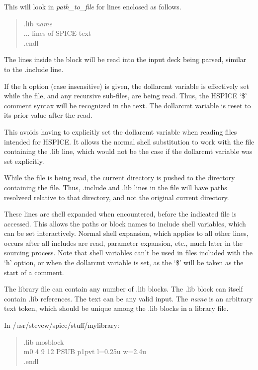 This will look in {\it path\_to\_file} for lines enclosed as follows.
\begin{quote}
    {\vt .lib} {\it name}\\
    ... lines of SPICE text\\
    {\vt .endl}
\end{quote}
The lines inside the block will be read into the input deck being
parsed, similar to the {\vt .include} line.

If the {\vt h} option (case insensitive) is given, the {\et dollarcmt}
variable is effectively set while the file, and any recursive
sub-files, are being read.  Thus, the HSPICE `{\vt \$}' comment syntax
will be recognized in the text.  The {\et dollarcmt} variable is reset
to its prior value after the read.

This avoids having to explicitly set the {\et dollarcmt} variable when
reading files intended for HSPICE.  It allows the normal {\WRspice}
shell substitution to work with the file containing the {\vt .lib}
line, which would not be the case if the {\et dollarcmt} variable was
set explicitly.

While the file is being read, the current directory is pushed to the
directory containing the file.  Thus, {\vt .include} and {\vt .lib}
lines in the file will have paths resolveed relative to that
directory, and not the original current directory.

These lines are shell expanded when encountered, before the indicated
file is accessed.  This allows the paths or block names to include
shell variables, which can be set interactively.  Normal shell
expansion, which applies to all other lines, occurs after all includes
are read, parameter expansion, etc., much later in the sourcing
process.  Note that shell variables can't be used in files included
with the `{\vt h}' option, or when the {\et dollarcmt} variable is
set, as the `{\vt \$}' will be taken as the start of a comment.

The library file can contain any number of {\vt .lib} blocks.  The
{\vt .lib} block can itself contain {\vt .lib} references.  The text
can be any valid {\WRspice} input.  The {\it name} is an arbitrary text
token, which should be unique among the {\vt .lib} blocks in a library
file.


    In {\vt /usr/stevew/spice/stuff/mylibrary}:
\begin{quote}\vt
    .lib mosblock\\
    m0 4 9 12 PSUB p1pvt l=0.25u w=2.4u\\
    .endl
\end{quote}

